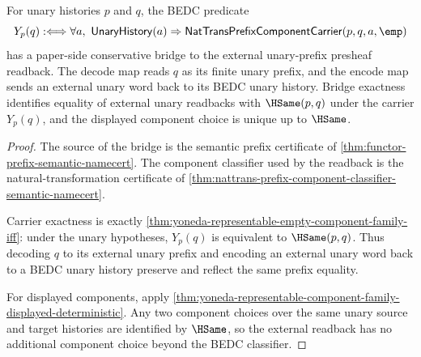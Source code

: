 \begin{theorem}
\label{thm:yoneda-prefix-empty-component-standard-bridge}
For unary histories $p$ and $q$, the BEDC predicate
$$
Y_p(q) :\Longleftrightarrow
\forall a,\ \mathsf{UnaryHistory}(a)\Rightarrow
\mathsf{NatTransPrefixComponentCarrier}(p,q,a,\emp)
$$
has a paper-side conservative bridge to the external unary-prefix presheaf
readback. The decode map reads $q$ as its finite unary prefix, and the encode
map sends an external unary word back to its BEDC unary history. Bridge
exactness identifies equality of external unary readbacks with $\HSame(p,q)$
under the carrier $Y_p(q)$, and the displayed component choice is unique up to
$\HSame$.
\end{theorem}
\begin{proof}
The source of the bridge is the semantic prefix certificate of
\autoref{thm:functor-prefix-semantic-namecert}. The component classifier used
by the readback is the natural-transformation certificate of
\autoref{thm:nattrans-prefix-component-classifier-semantic-namecert}.

Carrier exactness is exactly
\autoref{thm:yoneda-representable-empty-component-family-iff}: under the unary
hypotheses, $Y_p(q)$ is equivalent to $\HSame(p,q)$. Thus decoding $q$ to its
external unary prefix and encoding an external unary word back to a BEDC unary
history preserve and reflect the same prefix equality.

For displayed components, apply
\autoref{thm:yoneda-representable-component-family-displayed-deterministic}.
Any two component choices over the same unary source and target histories are
identified by $\HSame$, so the external readback has no additional component
choice beyond the BEDC classifier.
\end{proof}

